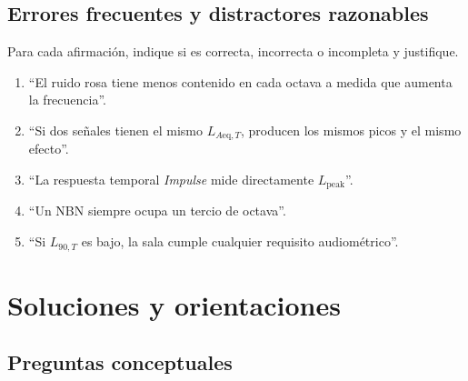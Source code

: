 \subsection*{Errores frecuentes y distractores razonables}

Para cada afirmación, indique si es correcta, incorrecta o incompleta y
justifique.

\begin{enumerate}[label=\textbf{D\arabic*.},leftmargin=*]
    \item ``El ruido rosa tiene menos contenido en cada octava a medida que
    aumenta la frecuencia''.
    \item ``Si dos señales tienen el mismo \(L_{A\mathrm{eq},T}\), producen los mismos
    picos y el mismo efecto''.
    \item ``La respuesta temporal \emph{Impulse} mide directamente
    \(L_{\mathrm{peak}}\)''.
    \item ``Un NBN siempre ocupa un tercio de octava''.
    \item ``Si \(L_{90,T}\) es bajo, la sala cumple cualquier requisito
    audiométrico''.
\end{enumerate}

\section{Soluciones y orientaciones}
\label{sec:u10-respuestas}

\subsection*{Preguntas conceptuales}

